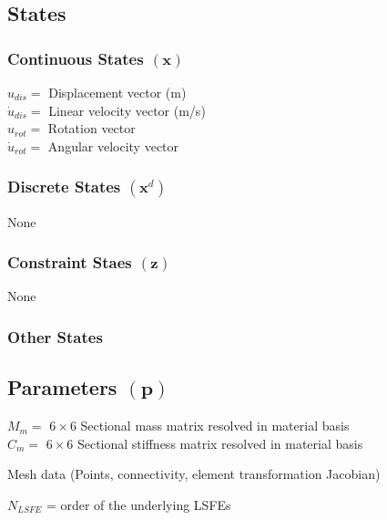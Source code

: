 \documentclass[11pt]{article}
\newcommand{\comm}[1]{\textcolor{blue}{\textit{#1}}}
\begin{document}
\subsection*{States}

\subsubsection*{Continuous States $(\textbf{x})$}

$u_{dis} = $ Displacement vector (m) \\
$\dot{u}_{dis} = $ Linear velocity vector (m/s) \\
$u_{rot} = $ Rotation vector\\
$\dot{u}_{rot} = $ Angular velocity vector

\subsubsection*{Discrete States $(\textbf{x}^d)$}

None

\subsubsection*{Constraint Staes $(\textbf{z})$}

None

\subsubsection*{Other States}

\subsection*{ Parameters $(\textbf{p})$}


$M_m = $ $6 \times 6$ Sectional mass matrix resolved in material basis \\
$C_m = $ $6 \times 6$ Sectional stiffness matrix resolved in material basis

Mesh data (Points, connectivity, element transformation Jacobian)

$N_{LSFE}$ = order of the underlying LSFEs
\end{document}
